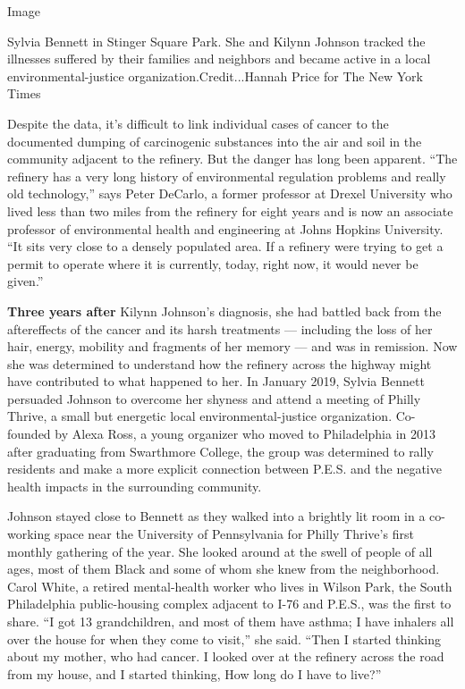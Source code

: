 Image

Sylvia Bennett in Stinger Square Park. She and Kilynn Johnson tracked
the illnesses suffered by their families and neighbors and became active
in a local environmental-justice organization.Credit...Hannah Price for
The New York Times

Despite the data, it's difficult to link individual cases of cancer to
the documented dumping of carcinogenic substances into the air and soil
in the community adjacent to the refinery. But the danger has long been
apparent. ``The refinery has a very long history of environmental
regulation problems and really old technology,'' says Peter DeCarlo, a
former professor at Drexel University who lived less than two miles from
the refinery for eight years and is now an associate professor of
environmental health and engineering at Johns Hopkins University. ``It
sits very close to a densely populated area. If a refinery were trying
to get a permit to operate where it is currently, today, right now, it
would never be given.''

\textbf{Three years after} Kilynn Johnson's diagnosis, she had battled
back from the aftereffects of the cancer and its harsh treatments ---
including the loss of her hair, energy, mobility and fragments of her
memory --- and was in remission. Now she was determined to understand
how the refinery across the highway might have contributed to what
happened to her. In January 2019, Sylvia Bennett persuaded Johnson to
overcome her shyness and attend a meeting of Philly Thrive, a small but
energetic local environmental-justice organization. Co-founded by Alexa
Ross, a young organizer who moved to Philadelphia in 2013 after
graduating from Swarthmore College, the group was determined to rally
residents and make a more explicit connection between P.E.S. and the
negative health impacts in the surrounding community.

Johnson stayed close to Bennett as they walked into a brightly lit room
in a co-working space near the University of Pennsylvania for Philly
Thrive's first monthly gathering of the year. She looked around at the
swell of people of all ages, most of them Black and some of whom she
knew from the neighborhood. Carol White, a retired mental-health worker
who lives in Wilson Park, the South Philadelphia public-housing complex
adjacent to I-76 and P.E.S., was the first to share. ``I got 13
grandchildren, and most of them have asthma; I have inhalers all over
the house for when they come to visit,'' she said. ``Then I started
thinking about my mother, who had cancer. I looked over at the refinery
across the road from my house, and I started thinking, How long do I
have to live?''

